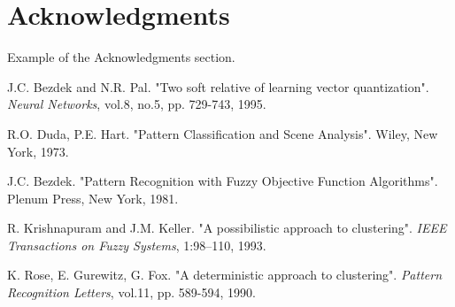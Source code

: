 \documentclass[12pt,a4paper]{cibb}
\begin{document}
\section*{\bf Acknowledgments}

Example of the Acknowledgments section.




{\fontsize{10}{10}\selectfont
\begin{thebibliography}{99}
\setlength{\parskip}{0pt}
J.C. Bezdek and N.R. Pal. "Two soft relative of learning
vector quantization".  {\em Neural Networks}, vol.8, no.5, pp. 729-743, 1995.

R.O. Duda, P.E. Hart.
"Pattern Classification and Scene Analysis".
Wiley, New York, 1973.

J.C. Bezdek.
"Pattern Recognition with Fuzzy Objective Function Algorithms".
Plenum Press, New York, 1981.

R. Krishnapuram and J.M. Keller.
"A possibilistic approach to clustering".
{\em IEEE Transactions on Fuzzy Systems}, 1:98--110, 1993.

K. Rose, E. Gurewitz, G. Fox.
"A deterministic approach to clustering".
{\em Pattern Recognition Letters}, vol.11, pp. 589-594, 1990.

\end{thebibliography}
}
\end{document}
